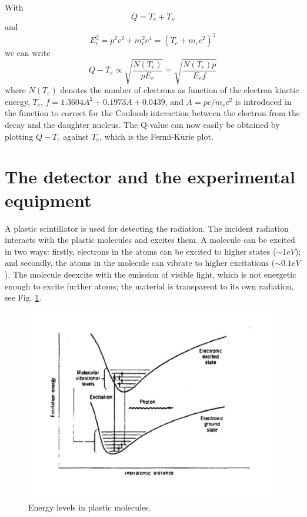 \documentclass[a4,11pt, notitlepage]{article}
\begin{document}
With
\begin{equation}
Q=T_e + T_{\nu}
\end{equation} 
and
\begin{equation}
E_e^2 = p^2c^2+m_e^2c^4=(T_e+m_ec^2)^2
\end{equation} 
we can write
\begin{equation}
Q-T_e \propto \sqrt{\frac{N(T_e)}{pE_e}} = \sqrt{\frac{N(T_e)p}{E_ef}}
\label{eq:f}
\end{equation}
where $N(T_e)$ denotes the number of electrons as function of the
electron kinetic energy, $T_e$, $f=1.3604A^2+0.1973A+0.0439$, and $A=pc/m_ec^2$ is introduced in the function to correct for the Coulomb interaction between the electron from the decay and the daughter nucleus. 
The Q-value can now easily be obtained by plotting $Q-T_e$ against $T_e$, which is the Fermi-Kurie plot.



\section{The detector and the experimental equipment}

A plastic scintillator is used for detecting the radiation. The
incident radiation interacts with the plastic molecules and excites
them. A molecule can be excited in two ways: firstly, electrons in the
atoms can be excited to higher states ($\sim 1 eV$); and secondly, the
atoms in the molecule can vibrate to higher excitations
($\sim 0.1 eV$). The molecule deexcite with the emission of visible
light, which is not energetic enough to excite further atoms; the
material is transparent to its own radiation, see Fig. \ref{fig:mol}.

\begin{figure}[htp]
  \vspace{40pt}
  \begin{center}
    \includegraphics[width=15.0cm]{figures/Energy.png}
    \caption{Energy levels in plastic molecules.} %
\label{fig:mol}
  \end{center}
\end{figure}
\end{document}
